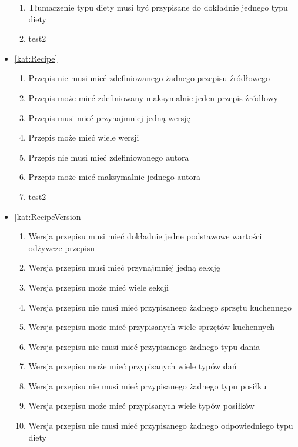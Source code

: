 \begin{itemize}[label={\textbf{Reguły dla}}, wide, labelwidth=!, labelindent=0pt]
\begin{enumerate}[label={\textbf{REG/\protect\threedigits{\arabic{enumi}}}}, wide, labelwidth=!, align=left, leftmargin=3cm, resume]
        \item Tłumaczenie typu diety musi być przypisane do dokładnie jednego typu diety
        \item test2
    \end{enumerate}
    \item\ref{kat:Recipe}
    \begin{enumerate}[label={\textbf{REG/\protect\threedigits{\arabic{enumi}}}}, wide, labelwidth=!, align=left, leftmargin=3cm, resume]
        \item Przepis nie musi mieć zdefiniowanego żadnego przepisu źródłowego
        \item Przepis może mieć zdefiniowany maksymalnie jeden przepis źródłowy
        \item Przepis musi mieć przynajmniej jedną wersję
        \item Przepis może mieć wiele wersji
        \item Przepis nie musi mieć zdefiniowanego autora
        \item Przepis może mieć maksymalnie jednego autora
        \item test2
    \end{enumerate}
    \item\ref{kat:RecipeVersion}
    \begin{enumerate}[label={\textbf{REG/\protect\threedigits{\arabic{enumi}}}}, wide, labelwidth=!, align=left, leftmargin=3cm, resume]
        \item Wersja przepisu musi mieć dokładnie jedne podstawowe wartości odżywcze przepisu
        \item Wersja przepisu musi mieć przynajmniej jedną sekcję
        \item Wersja przepisu może mieć wiele sekcji
        \item Wersja przepisu nie musi mieć przypisanego żadnego sprzętu kuchennego
        \item Wersja przepisu może mieć przypisanych wiele sprzętów kuchennych
        \item Wersja przepisu nie musi mieć przypisanego żadnego typu dania
        \item Wersja przepisu może mieć przypisanych wiele typów dań
        \item Wersja przepisu nie musi mieć przypisanego żadnego typu posiłku
        \item Wersja przepisu może mieć przypisanych wiele typów posiłków
        \item Wersja przepisu nie musi mieć przypisanego żadnego odpowiedniego typu diety

\end{enumerate}
\end{itemize}
